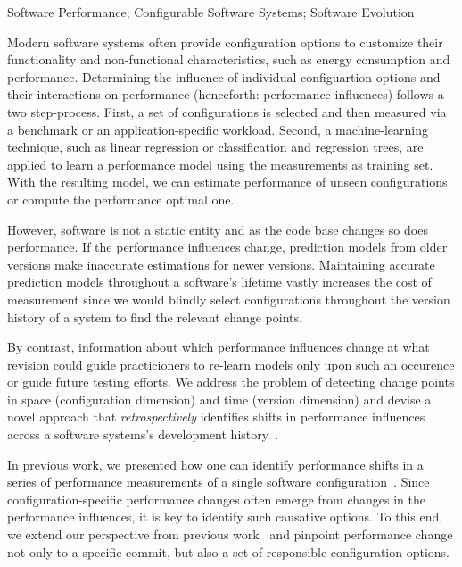 \documentclass[utf8,biblatex]{lni}
\begin{document}
\begin{keywords}
Software Performance; Configurable Software Systems; Software Evolution
\end{keywords}

Modern software systems often provide configuration options to customize their functionality and non-functional characteristics, such as energy consumption and performance. 
Determining the influence of individual configuartion options and their interactions on performance {\color{blue}(henceforth: performance influences)} follows a two step-process. First, a set of configurations is selected and then measured via a benchmark or an application-specific workload. Second, a machine-learning technique, such as linear regression or classification and regression trees, are applied to learn a performance model using the measurements as training set. With the resulting model, we can estimate performance of unseen configurations or compute the performance optimal one.

However, software is not a static entity and as the code base changes so does performance. If the {\color{blue}performance influences} change, prediction models from older versions make inaccurate estimations for newer versions. Maintaining accurate prediction models throughout a software's lifetime vastly increases the cost of measurement since we would blindly select configurations throughout the version history of a system to find the relevant change points.

By contrast, information about which {\color{blue}performance influences} change at what revision could guide practicioners to re-learn models only upon such an occurence or guide future testing efforts. 
We address the problem of detecting change points in space (configuration dimension) and time (version dimension) and devise a novel approach that \textit{retrospectively} identifies shifts in {\color{blue}performance influences} across a software systems’s development history~\cite{muehlbauer_identifying_2020}. 

In previous work, we presented how one can identify performance shifts in a series of performance measurements of a single software configuration~\cite{muhlbauer_accurate_2019}.
Since configuration-specific performance changes often emerge from changes in the {\color{blue}performance influences}, it is key to identify such causative options. To this end, we extend our perspective from previous work~\cite{muhlbauer_accurate_2019} and pinpoint performance change not only to a specific commit, but also a set of responsible configuration options. 
\end{document}
